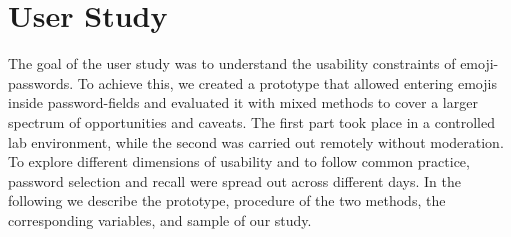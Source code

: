 \section{User Study}
The goal of the user study was to understand the usability constraints of emoji-passwords. To achieve this, we created a prototype that allowed entering emojis inside password-fields and evaluated it with mixed methods to cover a larger spectrum of opportunities and caveats. The first part took place in a controlled lab environment, while the second was carried out remotely without moderation. To explore different dimensions of usability and to follow common practice, password selection and recall were spread out across different days. In the following we describe the prototype, procedure of the two methods, the corresponding variables, and sample of our study. 

